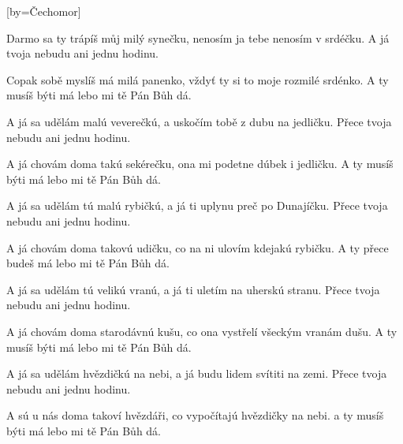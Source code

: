 [by={Čechomor}]

\beginverse{}
Darmo sa ty trápíš můj milý synečku,
nenosím ja tebe nenosím v srdéčku.
A já tvoja nebudu ani jednu hodinu.
\endverse{}

\beginverse{}
Copak sobě myslíš má milá panenko,
vždyť ty si to moje rozmilé srdénko.
A ty musíš býti má lebo mi tě Pán Bůh dá.
\endverse{}

\beginverse{}
A já sa udělám malú veverečkú,
a uskočím tobě z dubu na jedličku.
Přece tvoja nebudu ani jednu hodinu.
\endverse{}

\beginverse{}
A já chovám doma takú sekérečku,
ona mi podetne dúbek i jedličku.
A ty musíš býti má lebo mi tě Pán Bůh dá.
\endverse{}

\beginverse{}
A já sa udělám tú malú rybičkú,
a já ti uplynu preč po Dunajíčku.
Přece tvoja nebudu ani jednu hodinu.
\endverse{}

\beginverse{}
A já chovám doma takovú udičku,
co na ni ulovím kdejakú rybičku.
A ty přece budeš má lebo mi tě Pán Bůh dá.
\endverse{}

\beginverse{}
A já sa udělám tú velikú vranú,
a já ti uletím na uherskú stranu.
Přece tvoja nebudu ani jednu hodinu.
\endverse{}

\beginverse{}
A já chovám doma starodávnú kušu,
co ona vystřelí všeckým vranám dušu.
A ty musíš býti má lebo mi tě Pán Bůh dá.
\endverse{}

\beginverse{}
A já sa udělám hvězdičkú na nebi,
a já budu lidem svítiti na zemi.
Přece tvoja nebudu ani jednu hodinu.
\endverse{}

\beginverse{}
A sú u nás doma takoví hvězdáři,
co vypočítajú hvězdičky na nebi.
a ty musíš býti má lebo mi tě Pán Bůh dá.
\endverse{}

\endsong{}
